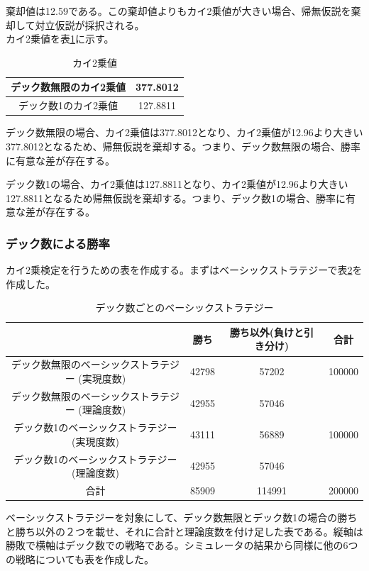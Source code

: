 棄却値は12.59である。この棄却値よりもカイ2乗値が大きい場合、帰無仮説を棄却して対立仮説が採択される。\\
カイ2乗値を表\ref{value1}に示す。
\begin{table}[H]
 \caption{カイ2乗値\label{value1}}
 \begin{center}
  \begin{tabular}{|c|c|}
   \hline デック数無限のカイ2乗値 & 377.8012 \\
 \hline デック数1のカイ2乗値 & 127.8811 \\
 \hline 
  \end{tabular}
 \end{center}
\end{table}
デック数無限の場合、カイ2乗値は377.8012となり、カイ2乗値が12.96より大きい377.8012となるため、帰無仮説を棄却する。つまり、デック数無限の場合、勝率に有意な差が存在する。

デック数1の場合、カイ2乗値は127.8811となり、カイ2乗値が12.96より大きい127.8811となるため帰無仮説を棄却する。つまり、デック数1の場合、勝率に有意な差が存在する。
\subsubsection{デック数による勝率}
カイ2乗検定を行うための表を作成する。まずはベーシックストラテジーで表\ref{deckbs}を作成した。
\begin{table}[H]
 \caption{デック数ごとのベーシックストラテジー\label{deckbs}}
 \begin{center}
  \begin{tabular}{|c|c|c|c|}
    \hline
      & 勝ち & 勝ち以外(負けと引き分け) & 合計 \\
    \hline デック数無限のベーシックストラテジー (実現度数)& 42798 & 57202 & 100000 \\
            デック数無限のベーシックストラテジー (理論度数)& 42955 & 57046 &  \\
    \hline デック数1のベーシックストラテジー (実現度数)& 43111 & 56889 & 100000 \\
            デック数1のベーシックストラテジー (理論度数)& 42955 & 57046 &  \\
    \hline  合計 & 85909 & 114991 & 200000 \\
    \hline
  \end{tabular}
 \end{center}
\end{table}
ベーシックストラテジーを対象にして、デック数無限とデック数1の場合の勝ちと勝ち以外の２つを載せ、それに合計と理論度数を付け足した表である。縦軸は勝敗で横軸はデック数での戦略である。シミュレータの結果から同様に他の6つの戦略についても表を作成した。

